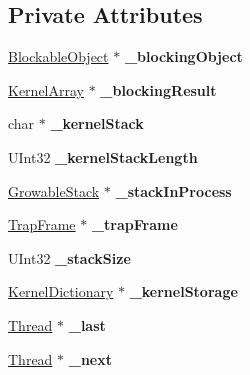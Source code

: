 \subsection*{Private Attributes}
\begin{DoxyCompactItemize}
\item 
\mbox{\label{class_thread_ac2841d6959516c8bafd6059fbca48fa2}} 
\hyperlink{class_blockable_object}{Blockable\+Object} $\ast$ {\bfseries \+\_\+blocking\+Object}
\item 
\mbox{\label{class_thread_a764d22efe7356460a0d75b263d58e9cc}} 
\hyperlink{class_kernel_array}{Kernel\+Array} $\ast$ {\bfseries \+\_\+blocking\+Result}
\item 
\mbox{\label{class_thread_a341add04c9b559231e44d2778fc4d92a}} 
char $\ast$ {\bfseries \+\_\+kernel\+Stack}
\item 
\mbox{\label{class_thread_ac92145baac53d87f67790505db367332}} 
U\+Int32 {\bfseries \+\_\+kernel\+Stack\+Length}
\item 
\mbox{\label{class_thread_a223aa212539b83642d8f66bb0f7d621b}} 
\hyperlink{class_growable_stack}{Growable\+Stack} $\ast$ {\bfseries \+\_\+stack\+In\+Process}
\item 
\mbox{\label{class_thread_a5ac9b92f6e77107695dbf899952777ea}} 
\hyperlink{struct_trap_frame}{Trap\+Frame} $\ast$ {\bfseries \+\_\+trap\+Frame}
\item 
\mbox{\label{class_thread_ac7ff8161fe56dfa003aeccb101c10e3e}} 
U\+Int32 {\bfseries \+\_\+stack\+Size}
\item 
\mbox{\label{class_thread_a9abb18002e2e455645df8124543a4382}} 
\hyperlink{class_kernel_dictionary}{Kernel\+Dictionary} $\ast$ {\bfseries \+\_\+kernel\+Storage}
\item 
\mbox{\label{class_thread_a3c6f449141ff986e52f23d868819faa1}} 
\hyperlink{class_thread}{Thread} $\ast$ {\bfseries \+\_\+last}
\item 
\mbox{\label{class_thread_a940e7caec8751ba76db54ce4724e2f24}} 
\hyperlink{class_thread}{Thread} $\ast$ {\bfseries \+\_\+next}
\end{DoxyCompactItemize}
